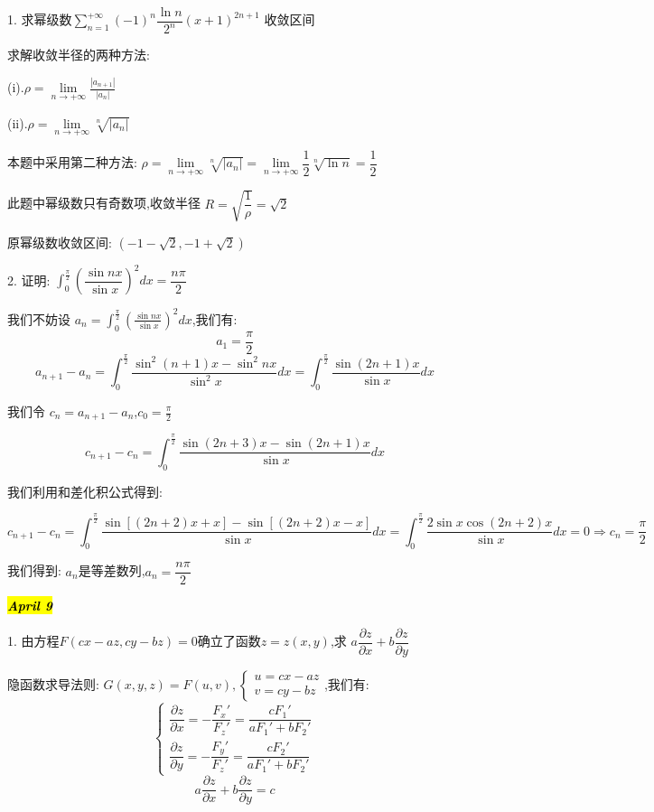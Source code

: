 1. 求幂级数$\sum\limits_{n=1}^{+\infty}(-1)^{n}\dfrac{\ln n}{2^{n}}(x+1)^{2n+1}$ 收敛区间
\begin{solution}
	
	求解收敛半径的两种方法: 
	
	(i).$\rho=\lim\limits_{n\rightarrow +\infty}\frac{|a_{n+1}|}{|a_{n}|}$
	
	(ii).$\rho=\lim\limits_{n\rightarrow +\infty}\sqrt[n]{|a_{n}|}$
	
	本题中采用第二种方法: $\rho=\lim\limits_{n\rightarrow +\infty}\sqrt[n]{|a_{n}|}=\lim\limits_{n\rightarrow +\infty}\dfrac{1}{2}\sqrt[n]{\ln n}=\dfrac{1}{2}$
	
	此题中幂级数只有奇数项,收敛半径 $R=\sqrt{\dfrac{1}{\rho}}=\sqrt{2}$
	
	原幂级数收敛区间: $(-1-\sqrt{2},-1+\sqrt{2})$
\end{solution}

2. 证明: $\int_{0}^{\frac{\pi}{2}}\left( \dfrac{\sin nx}{\sin x}\right) ^2dx=\dfrac{n\pi}{2}$
\begin{solution}
	
	我们不妨设 $a_{n}=\int_{0}^{\frac{\pi}{2}}(\frac{\sin nx}{\sin x})^2dx$,我们有: 
	$$a_{1}=\frac{\pi}{2}$$ $$a_{n+1}-a_{n}=\int_{0}^{\frac{\pi}{2}}\frac{\sin ^2(n+1)x-\sin^2 nx}{\sin^2 x}dx=\int_{0}^{\frac{\pi}{2}}\frac{\sin (2n+1)x}{\sin x}dx$$
	
	我们令 $c_{n}=a_{n+1}-a_{n}$,$c_{0}=\frac{\pi}{2}$
	
	$$c_{n+1}-c_{n}=\int_{0}^{\frac{\pi}{2}}\frac{\sin (2n+3)x-\sin (2n+1)x}{\sin x}dx$$
	
	我们利用和差化积公式得到: 
	
	$$c_{n+1}-c_{n}=\int_{0}^{\frac{\pi}{2}}\frac{\sin [(2n+2)x+x]-\sin [(2n+2)x-x]}{\sin x}dx=\int_{0}^{\frac{\pi}{2}}\frac{2\sin x\cos(2n+2)x}{\sin x}dx=0\Rightarrow c_{n}=\frac{\pi}{2}$$
	
	我们得到: $a_{n}$是等差数列,$a_{n}=\dfrac{n\pi}{2}$
\end{solution}

\hl{\textbf{\textit{April 9}}}

1. 由方程$F(cx-az,cy-bz)=0$确立了函数$z=z(x,y)$,求 $a\dfrac{\partial z}{\partial x}+b\dfrac{\partial z}{\partial y}$
\begin{solution}
	
	隐函数求导法则: 
	$G(x,y,z)=F(u,v),\left\lbrace\begin{array}{l}
		u=cx-az\\v=cy-bz
	\end{array} \right. $,我们有: 
	$$\left\lbrace\begin{array}{l}
		\dfrac{\partial z}{\partial x}=-\dfrac{F_{x}'}{F_{z}'}=\dfrac{cF_{1}'}{aF_{1}'+bF_{2}'}\\
		\dfrac{\partial z}{\partial y}=-\dfrac{F_{y}'}{F_{z}'}=\dfrac{cF_{2}'}{aF_{1}'+bF_{2}'}
	\end{array} \right. $$
	$$a\dfrac{\partial z}{\partial x}+b\dfrac{\partial z}{\partial y}=c$$
\end{solution}

